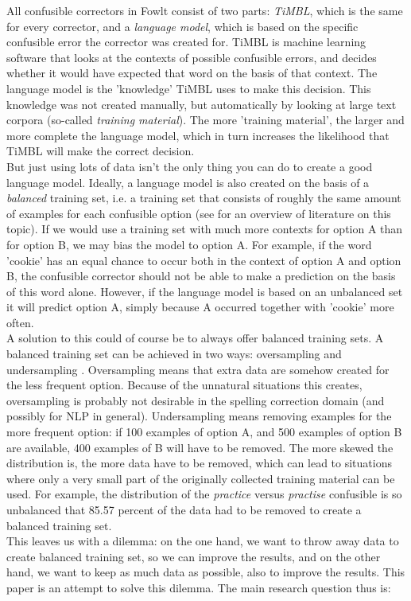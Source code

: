 \documentclass[12pt]{article}
\begin{document}
All confusible correctors in Fowlt consist of two parts: \emph{TiMBL}, which is the same for every corrector, and a \emph{language model}, which is based on the specific confusible error the corrector was created for. TiMBL is machine learning software that looks at the contexts of possible confusible errors, and decides whether it would have expected that word on the basis of that context. The language model is the 'knowledge' TiMBL uses to make this decision. This knowledge was not created manually, but automatically by looking at large text corpora (so-called \emph{training material}). The more 'training material', the larger and more complete the language model, which in turn increases the likelihood that TiMBL will make the correct decision. \\\indent
But just using lots of data isn't the only thing you can do to create a good language model. Ideally, a language model is also created on the basis of a \emph{balanced} training set, i.e. a training set that consists of roughly the same amount of examples for each confusible option (see \citealt{hg09} for an overview of literature on this topic). If we would use a training set with much more contexts for option A than for option B, we may bias the model to option A. For example, if the word 'cookie' has an equal chance to occur both in the context of option A and option B, the confusible corrector should not be able to make a prediction on the basis of this word alone. However, if the language model is based on an unbalanced set it will predict option A, simply because A occurred together with 'cookie' more often. \\\indent
A solution to this could of course be to always offer balanced training sets. A balanced training set can be achieved in two ways: oversampling and undersampling \citep{provost, gh09, vhkn07, hg09}. Oversampling means that extra data are somehow created for the less frequent option. Because of the unnatural situations this creates, oversampling is probably not desirable in the spelling correction domain (and possibly for NLP in general). Undersampling means removing examples for the more frequent option: if 100 examples of option A, and 500 examples of option B are available, 400 examples of B will have to be removed. The more skewed the distribution is, the more data have to be removed, which can lead to situations where only a very small part of the originally collected training material can be used. For example, the distribution of the \emph{practice} versus \emph{practise} confusible is so unbalanced that 85.57 percent of the data had to be removed to create a balanced training set. \\\indent
This leaves us with a dilemma: on the one hand, we want to throw away data to create balanced training set, so we can improve the results, and on the other hand, we want to keep as much data as possible, also to improve the results. This paper is an attempt to solve this dilemma. The main research question thus is:
\end{document}
